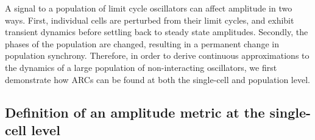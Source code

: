 \documentclass[11pt, letterpaper]{article}
\providecommand{\DIFadd}[1]{{\protect\color{blue}#1}} %
\providecommand{\DIFaddbegin}{} %
\providecommand{\DIFaddend}{} %
\begin{document}
\DIFadd{A signal to a population of limit cycle oscillators can affect amplitude in two ways.
First, individual cells are perturbed from their limit cycles, and exhibit transient dynamics before settling back to steady state amplitudes.
Secondly, the phases of the population are changed, resulting in a permanent change in population synchrony.
Therefore, in order to derive continuous approximations to the dynamics of a large population of non-interacting oscillators, we first demonstrate how ARCs can be found at both the single-cell and population level.
}

\DIFaddend \subsection*{Definition of an amplitude metric \DIFaddbegin \DIFadd{at the single-cell level}\DIFaddend }
\DIFaddbegin 
\end{document}
